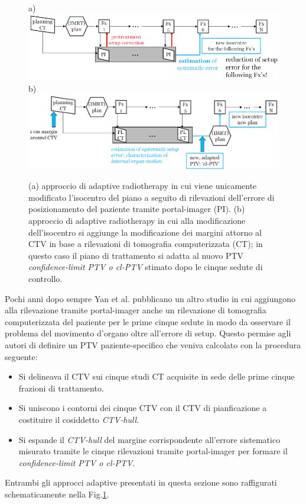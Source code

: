 \begin{figure}[!t]
\centering
a)\includegraphics[width=.95\textwidth]{./cap3/adapt1.png}
b)\includegraphics[width=.95\textwidth]{./cap3/adapt2.png}
\caption{(a) approccio di adaptive radiotherapy in cui viene unicamente modificato l'isocentro del piano a seguito di rilevazioni dell'errore di posizionamento del paziente tramite portal-imager (PI). (b) approccio di adaptive radiotherapy in cui alla modificazione dell'isocentro si aggiunge la modificazione dei margini attorno al CTV in base a rilevazioni di tomografia computerizzata (CT); in questo caso il piano di trattamento si adatta al nuovo PTV \textit{confidence-limit PTV o cl-PTV} stimato dopo le cinque sedute di controllo.}
\label{fig:adaptYAN}
\end{figure}

Pochi anni dopo sempre Yan et al.\cite{Yan2000} pubblicano un altro studio in cui aggiungono alla rilevazione tramite portal-imager anche un rilevazione di tomografia computerizzata del paziente per le prime cinque sedute in modo da osservare il problema del movimento d'organo oltre all'errore di setup. Questo permise agli autori di definire un PTV paziente-specifico che veniva calcolato con la procedura seguente:
\begin{itemize}
\item Si delineava il CTV sui cinque studi CT acquisite in sede delle prime cinque frazioni di trattamento.
\item Si uniscono i contorni dei cinque CTV con il CTV di pianficazione a costituire il cosiddetto \textit{CTV-hull}.
\item Si espande il \textit{CTV-hull} del margine corrispondente all'errore sistematico misurato tramite le cinque rilevazioni tramite portal-imager per formare il \textit{confidence-limit PTV o cl-PTV}. 
\end{itemize}
Entrambi gli approcci adaptive presentati in questa sezione sono raffigurati schematicamente nella Fig.\ref{fig:adaptYAN}.

